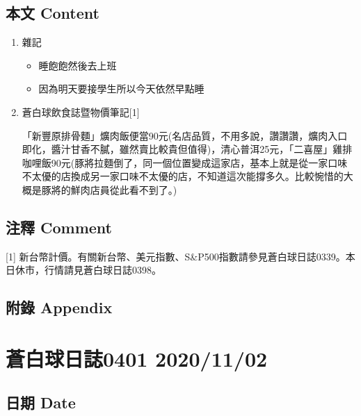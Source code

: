 \documentclass[a5paper, 11pt
]{book}
\providecommand{\tightlist}{%
  \setlength{\itemsep}{0pt}\setlength{\parskip}{0pt}}
\begin{document}
\hypertarget{ux672cux6587-content-58}{%
\subsection{本文 Content}\label{ux672cux6587-content-58}}

\begin{enumerate}
\def\labelenumi{\arabic{enumi}.}
\item
  雜記

  \begin{itemize}
  \tightlist
  \item
    睡飽飽然後去上班
  \item
    因為明天要接學生所以今天依然早點睡
  \end{itemize}
\item
  蒼白球飲食誌暨物價筆記{[}1{]}

  「新豐原排骨麵」爌肉飯便當90元(名店品質，不用多說，讚讚讚，爌肉入口即化，醬汁甘香不膩，雖然賣比較貴但值得)，清心普洱25元，「二喜屋」雞排咖哩飯90元(豚將拉麵倒了，同一個位置變成這家店，基本上就是從一家口味不太優的店換成另一家口味不太優的店，不知道這次能撐多久。比較惋惜的大概是豚將的鮮肉店員從此看不到了。)
\end{enumerate}

\hypertarget{ux6ce8ux91cb-comment-58}{%
\subsection{注釋 Comment}\label{ux6ce8ux91cb-comment-58}}

{[}1{]}
新台幣計價。有關新台幣、美元指數、S\&P500指數請參見蒼白球日誌0339。本日休市，行情請見蒼白球日誌0398。

\hypertarget{ux9644ux9304-appendix-58}{%
\subsection{附錄 Appendix}\label{ux9644ux9304-appendix-58}}

\hypertarget{ux84bcux767dux7403ux65e5ux8a8c0401-20201102}{%
\section{蒼白球日誌0401
2020/11/02}\label{ux84bcux767dux7403ux65e5ux8a8c0401-20201102}}

\hypertarget{ux65e5ux671f-date-59}{%
\subsection{日期 Date}\label{ux65e5ux671f-date-59}}
\end{document}
